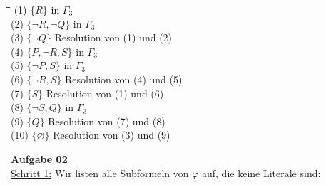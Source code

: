 \documentclass[a4paper,10pt]{article}
\begin{document}
\begin{compactenum} [(a)]
\begin{compactitem}
			\begin{tabbing}
				\= \qquad \= \qquad\qquad\qquad \= \qquad\qquad \kill
				\>(1) \> $ \{R\} $ \> in $ \Gamma_3 $ \\
				\>(2) \> $ \{\lnot R, \lnot Q\} $ \> in $ \Gamma_3 $ \\
				\>(3) \> $ \{\lnot Q \} $ \> Resolution von (1) und (2) \\
				\>(4) \> $ \{P ,\lnot R, S\} $ \> in $ \Gamma_3 $\\
				\>(5) \> $ \{\lnot P, S\} $ \> in $ \Gamma_3 $ \\
				\>(6) \> $ \{\lnot R, S\} $ \> Resolution von (4) und (5) \\
				\>(7) \> $ \{S\} $ \> Resolution von (1) und (6) \\
				\>(8) \> $ \{\lnot S, Q\} $ \> in $ \Gamma_3 $ \\
				\>(9) \> $ \{Q\} $ \> Resolution von (7) und (8) \\
				\>(10) \> $ \{\varnothing\} $ \> Resolution von (3) und (9) \\
			\end{tabbing}
		\end{compactitem}
	\end{compactenum}
	\textbf{Aufgabe 02} \\
	\underline{Schritt 1:} Wir listen alle Subformeln von $ \varphi  $ auf, die keine Literale sind: \\
	
\end{document}
